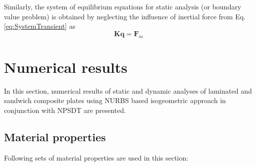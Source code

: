 \documentclass[3p,preprint,12pt]{elsarticle}
\begin{document}
Similarly, the system of equilibrium equations for static analysis (or boundary value problem) \cite{reddy2004mechanics} is obtained by neglecting the influence of inertial force from Eq. \cref{eq:SystemTransient}  as
\begin{equation*}
\boldsymbol{K} \boldsymbol{q}  = \boldsymbol{F}_{m}
\end{equation*}

\section{Numerical results}
In this section, numerical results of static and dynamic analyses of laminated and sandwich composite plates using NURBS based isogeometric approach in conjunction with NPSDT are presented.

\subsection{Material properties}
Following sets of material properties are used in this section:
\end{document}
